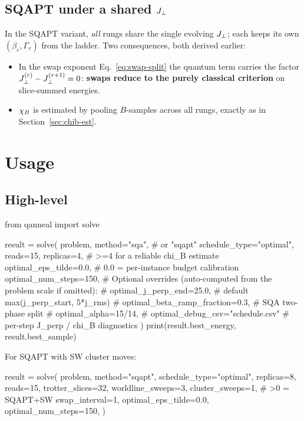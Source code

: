 \subsection{SQAPT under a shared $J_{\perp}$}
\label{sec:sqapt-optimal}

In the SQAPT variant, \emph{all} rungs share the single evolving $J_{\perp}$;
each keeps its own $(\beta_r,\Gamma_r)$ from the ladder. Two consequences,
both derived earlier:
\begin{itemize}
\item In the swap exponent Eq.~\eqref{eq:swap-split} the quantum term
carries the factor $J_{\perp}^{(r)}-J_{\perp}^{(r+1)}=0$: \textbf{swaps reduce to the
purely classical criterion} on slice-summed energies.
\item $\chi_B$ is estimated by pooling $B$-samples across all rungs, exactly
as in Section~\ref{sec:chib-est}.
\end{itemize}

\section{Usage}

\subsection{High-level}

\begin{pycode}
from qanneal import solve

result = solve(
    problem,
    method="sqa",              # or "sqapt"
    schedule_type="optimal",
    reads=15,
    replicas=4,                # >=4 for a reliable chi_B estimate
    optimal_eps_tilde=0.0,     # 0.0 = per-instance budget calibration
    optimal_num_steps=150,
    # Optional overrides (auto-computed from the problem scale if omitted):
    # optimal_j_perp_end=25.0,         # default max(j_perp_start, 5*j_rms)
    # optimal_beta_ramp_fraction=0.3,  # SQA two-phase split
    # optimal_alpha=15/14,
    # optimal_debug_csv="schedule.csv" # per-step J_perp / chi_B diagnostics
)
print(result.best_energy, result.best_sample)
\end{pycode}

For SQAPT with SW cluster moves:

\begin{pycode}
result = solve(
    problem,
    method="sqapt",
    schedule_type="optimal",
    replicas=8, reads=15,
    trotter_slices=32,
    worldline_sweeps=3,
    cluster_sweeps=1,          # >0 = SQAPT+SW
    swap_interval=1,
    optimal_eps_tilde=0.0,
    optimal_num_steps=150,
)
\end{pycode}

